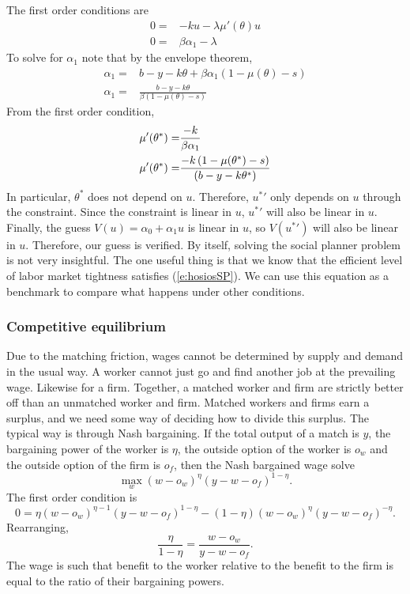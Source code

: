 \documentclass[12pt,reqno]{amsart}
\theoremstyle{definition}
\begin{document}
The first order conditions are
\begin{align*}
  0 = & -ku - \lambda \mu'(\theta) u \\
  0 = & \beta \alpha_1 - \lambda
\end{align*}
To solve for $\alpha_1$ note that by the envelope theorem,
\begin{align*} \alpha_1 = & b - y - k\theta + \beta
  \alpha_1\left(1-\mu(\theta) - s \right) \\ 
  \alpha_1 = & \frac{b - y - k\theta}{\beta\left(1-\mu(\theta) - s
    \right)} 
\end{align*}
From the first order condition,
\begin{align}
  \mu'(\theta^*) = & \frac{-k}{\beta \alpha_1} \notag \\
  \mu'(\theta^*) = & \frac{-k\left(1-\mu(\theta^*) - s \right)}{ \left(b-y-k
      \theta^* \right)} \label{e:hosiosSP}
\end{align}
In particular, $\theta^*$ does not depend on $u$. Therefore, ${u^*}'$ only
depends on $u$ through the constraint. Since the constraint is linear
in $u$, ${u^*}'$ will also be linear in $u$. Finally, the guess $V(u) =
\alpha_0 + \alpha_1 u$ is linear in $u$, so $V({u^*}')$ will also be
linear in $u$. Therefore, our guess is verified. By itself, solving
the social planner problem is not very insightful. The one useful
thing is that we know that the efficient level of labor market
tightness satisfies (\ref{e:hosiosSP}). We can use this equation as a
benchmark to compare what happens under other conditions. 

\subsubsection{Competitive equilibrium} 

Due to the matching friction, wages cannot be determined by supply and
demand in the usual way. A worker cannot just go and find another job
at the prevailing wage. Likewise for a firm. Together, a matched
worker and firm are strictly better off than an unmatched worker and
firm. Matched workers and firms earn a surplus, and we need some way
of deciding how to divide this surplus. The typical way is through
Nash bargaining. If the total output of a match is $y$, the bargaining
power of the worker is $\eta$, the outside option of the worker is
$o_w$ and the outside option of the firm is $o_f$, then the Nash
bargained wage solve
\[ \max_w (w - o_w)^\eta (y-w - o_f)^{1-\eta}. \]
The first order condition is
\[ 0 = \eta (w - o_w)^{\eta-1} (y-w - o_f)^{1-\eta} - (1-\eta) (w -
o_w)^\eta (y-w - o_f)^{-\eta}. \]
Rearranging,
\[ \frac{\eta}{1-\eta} = \frac{ w - o_w} {y-w - o_f}. \]
The wage is such that benefit to the worker relative to the benefit to
the firm is equal to the ratio of their bargaining powers. 
\end{document}
